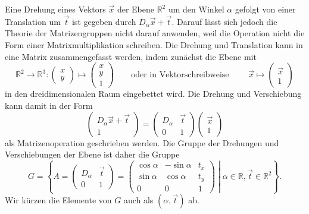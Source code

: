 Eine Drehung eines Vektors $\vec{x}$ der Ebene $\mathbb{R}^2$
um den Winkel $\alpha$ gefolgt von einer Translation um $\vec{t}$
ist gegeben durch $D_\alpha\vec{x}+\vec{t}$.
Darauf lässt sich jedoch die Theorie der Matrizengruppen nicht
darauf anwenden, weil die Operation nicht die Form einer Matrixmultiplikation
schreiben.
Die Drehung und Translation kann in eine Matrix zusammengefasst werden,
indem zunächst die Ebene mit
\[
\mathbb{R}^2\to\mathbb{R}^3
:
\begin{pmatrix}x\\y\end{pmatrix}
\mapsto
\begin{pmatrix}x\\y\\1\end{pmatrix}
\qquad\text{oder in Vektorschreibweise }\qquad
\vec{x}\mapsto\begin{pmatrix}\vec{x}\\1\end{pmatrix}
\]
in den dreidimensionalen Raum eingebettet wird.
Die Drehung und Verschiebung kann damit in der Form
\[
\begin{pmatrix}D_\alpha\vec{x}+\vec{t}\\1
\end{pmatrix}
=
\begin{pmatrix}D_\alpha&\vec{t}\\0&1\end{pmatrix}
\begin{pmatrix}\vec{x}\\1\end{pmatrix}
\]
als Matrizenoperation geschrieben werden.
Die Gruppe der Drehungen und Verschiebungen der Ebene ist daher
die Gruppe
\[
G
=
\left\{
\left.
A
=
\begin{pmatrix}
D_\alpha&\vec{t}\\
0&1
\end{pmatrix}
=
\begin{pmatrix}
\cos\alpha & -\sin\alpha & t_x \\
\sin\alpha &  \cos\alpha & t_y \\
     0     &       0     &  1
\end{pmatrix}
\;
\right|
\;
\alpha\in\mathbb{R},\vec{t}\in\mathbb{R}^2
\right\}.
\]
Wir kürzen die Elemente von $G$ auch als $(\alpha,\vec{t})$ ab.
